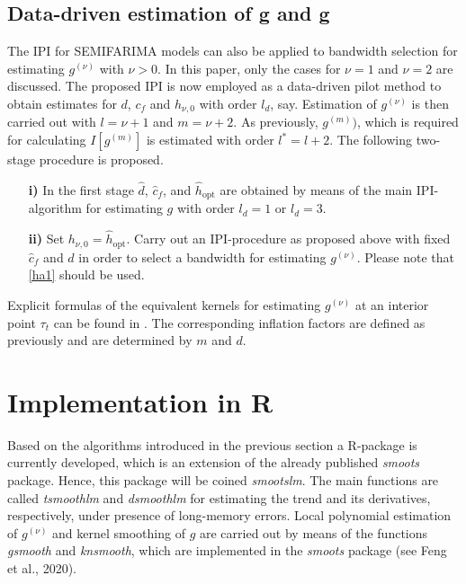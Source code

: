 \documentclass[12pt]{article}
\begin{document}

\subsection{Data-driven estimation of g\textquotesingle{} and g\textquotesingle \textquotesingle}
The IPI for SEMIFARIMA models can also be applied to bandwidth selection for estimating $g^{(\nu)}$ with $\nu > 0$. In this paper, only the cases for $\nu = 1$ and $\nu = 2$ are discussed. The proposed IPI is now employed as a data-driven pilot method to obtain estimates for $d$, $c_f$ and $h_{\nu, 0}$ with order $l_d$, say. Estimation of $g^{(\nu)}$ is then carried out with $l = \nu + 1$ and $m = \nu + 2$. As previously, $g^{(m)})$, which is required for calculating $I[g^{(m)}]$ is estimated with order $l^* = l + 2$. The following two-stage procedure is proposed.
\begin{itemize}
	\item[\textbf{i)}] In the first stage $\hat{d}$, $\hat{c}_f$, and $\hat{h}_{\text{opt}}$ are obtained by means of the main IPI-algorithm for estimating $g$ with order $l_d = 1$ or $l_d = 3$.
	
	\item[\textbf{ii)}] Set $h_{\nu,0} = \hat{h}_{\text{opt}}$. Carry out an IPI-procedure as proposed above with fixed $\hat{c}_f$ and $\hat{d}$ in order to select a bandwidth for estimating $g^{(\nu)}$. Please note that \eqref{ha1} should be used. 
\end{itemize}
Explicit formulas of the equivalent kernels for estimating $g^{(\nu)}$ at an interior point $\tau_t$ can be found in \citet{muller1988longitudinal}. The corresponding inflation factors are defined as previously and are determined by $m$ and $d$.

\section{Implementation in R}
Based on the algorithms introduced in the previous section a R-package is currently developed, which is an extension of the already published \textit{smoots} package. Hence, this package will be coined \textit{smootslm}. The main functions are called \textit{tsmoothlm} and \textit{dsmoothlm} for estimating the trend and its derivatives, respectively, under presence of long-memory errors. Local polynomial estimation of  $g^{(\nu)}$ and kernel smoothing of $g$ are carried out by means of the functions \textit{gsmooth} and \textit{knsmooth}, which are implemented in the \textit{smoots} package (see Feng et al., 2020).
\end{document}
